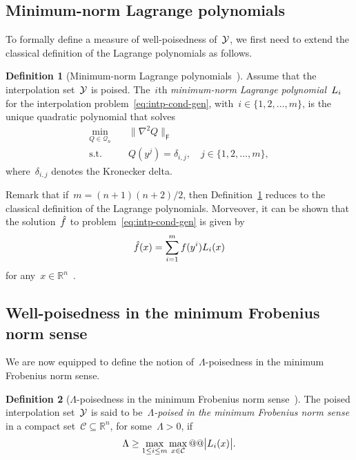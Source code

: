 \documentclass[draft]{article}
\numberwithin{equation}{section}
\theoremstyle{definition}
\newtheorem{definition}{Definition}[section]
\theoremstyle{plain}
\theoremstyle{remark}
\newcommand*{\abs}[2][]{#1\lvert#2#1\rvert}
\newcommand*{\lagp}[1][]{L\ifblank{#1}{}{_{#1}}}
\newcommand*{\norm}[2][]{#1\lVert#2#1\rVert}
\newcommand*{\obj}{f}
\newcommand*{\objm}[1][]{\hat{\obj}\ifblank{#1}{}{^{#1}}}
\newcommand*{\qpoly}{\mathcal{Q}_n}
\newcommand*{\R}{\mathbb{R}}
\newcommand*{\set}[2][]{#1\{#2#1\}}
\newcommand*{\xpt}[1][]{\mathcal{Y}\ifblank{#1}{}{^{#1}}}
\begin{document}
\subsection{Minimum-norm Lagrange polynomials}

To formally define a measure of well-poisedness of~$\xpt$, we first need to extend the classical definition of the Lagrange polynomials as follows.

\begin{definition}[Minimum-norm Lagrange polynomials~{\cite[Definition~5.1]{Conn_Scheinberg_Vicente_2009}}]
    \label{def:min-norm-lagp}
    Assume that the interpolation set~$\xpt$ is poised.
    The~$i$th \emph{minimum-norm Lagrange polynomial}~$\lagp[i]$ for the interpolation problem~\eqref{eq:intp-cond-gen}, with~$i \in \set{1, 2, \dots, m}$, is the unique quadratic polynomial that solves
    \begin{equation*}
        \begin{aligned}
            \min_{Q \in \qpoly} & \quad \norm[\big]{\nabla^2 Q}_{\mathsf{F}}\\
            \text{s.t.}         & \quad Q(y^j) = \delta_{i, j}, \quad j \in \set{1, 2, \dots, m},
        \end{aligned}
    \end{equation*}
    where~$\delta_{i, j}$ denotes the Kronecker delta.
\end{definition}

Remark that if~$m = (n + 1) (n + 2) / 2$, then Definition~\ref{def:min-norm-lagp} reduces to the classical definition of the Lagrange polynomials.
Morveover, it can be shown that the solution~$\objm$ to problem~\eqref{eq:intp-cond-gen} is given by
\begin{equation*}
    \objm(x) = \sum_{i = 1}^m \obj(y^i) \lagp[i](x)
\end{equation*}
for any~$x \in \R^n$~\cite[Lemma~5.2]{Conn_Scheinberg_Vicente_2009}.

\subsection{Well-poisedness in the minimum Frobenius norm sense}

We are now equipped to define the notion of~$\Lambda$-poisedness in the minimum Frobenius norm sense.

\begin{definition}[$\Lambda$-poisedness in the minimum Frobenius norm sense~{\cite[Definition~5.6]{Conn_Scheinberg_Vicente_2009}}]
    \label{def:lambda-p}
    The poised interpolation set~$\xpt$ is said to be~\emph{$\Lambda$-poised in the minimum Frobenius norm sense} in a compact set~$\mathcal{C} \subseteq \R^n$, for some~$\Lambda > 0$, if
    \begin{equation*}
        \Lambda \ge \max_{1 \le i \le m} \max_{x \in \mathcal{C}} @@ \abs[\big]{\lagp[i](x)}.
    \end{equation*}
\end{definition}
\end{document}
